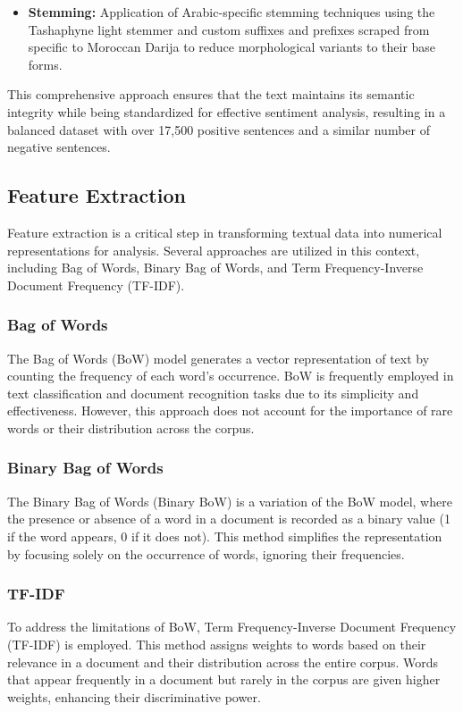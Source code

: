 \documentclass[a4paper,40pt,twocolumn]{article}
\begin{document}
\begin{itemize}
\begin{itemize}
    \item \textbf{Stemming:} Application of Arabic-specific stemming techniques using the Tashaphyne light stemmer and custom suffixes and prefixes scraped from \cite{suf1} specific to Moroccan Darija to reduce morphological variants to their base forms.

\end{itemize}

This comprehensive approach ensures that the text maintains its semantic integrity while being standardized for effective sentiment analysis, resulting in a balanced dataset with over 17,500 positive sentences and a similar number of negative sentences.

\end{itemize}


\subsection{Feature Extraction}

Feature extraction is a critical step in transforming textual data into numerical representations for analysis. Several approaches are utilized in this context, including Bag of Words, Binary Bag of Words, and Term Frequency-Inverse Document Frequency (TF-IDF).

\subsubsection{Bag of Words}
The Bag of Words (BoW) model generates a vector representation of text by counting the frequency of each word's occurrence. BoW is frequently employed in text classification and document recognition tasks due to its simplicity and effectiveness. However, this approach does not account for the importance of rare words or their distribution across the corpus.

\subsubsection{Binary Bag of Words}
The Binary Bag of Words (Binary BoW) is a variation of the BoW model, where the presence or absence of a word in a document is recorded as a binary value (1 if the word appears, 0 if it does not). This method simplifies the representation by focusing solely on the occurrence of words, ignoring their frequencies.


\subsubsection{TF-IDF}
To address the limitations of BoW, Term Frequency-Inverse Document Frequency (TF-IDF) is employed. This method assigns weights to words based on their relevance in a document and their distribution across the entire corpus. Words that appear frequently in a document but rarely in the corpus are given higher weights, enhancing their discriminative power.
\end{document}
